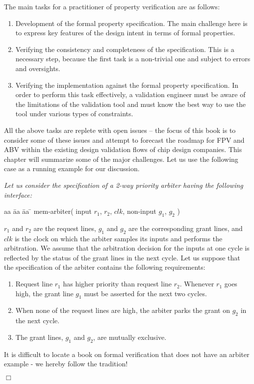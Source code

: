 The main tasks for a practitioner of property verification are as follows:
\begin{enumerate}

\item Development of the formal property specification. The main challenge
	here is to express key features of the design intent in terms of
	formal properties.

\item Verifying the consistency and completeness of the specification. This
	is a necessary step, because the first task is a non-trivial one and 
	subject to errors and oversights.

\item Verifying the implementation against the formal property specification.
	In order to perform this task effectively, a validation engineer must
	be aware of the limitations of the validation tool and must know
	the best way to use the tool under various types of constraints.

\end{enumerate}
All the above tasks are replete with open issues -- the focus of this book is 
to consider some of these issues and attempt to forecast the roadmap for FPV 
and ABV within the existing design validation flows of chip design companies.
This chapter will summarize some of the major challenges. Let us use the
following case as a running example for our discussion.

\begin{example} \label{ex1}
{\em
Let us consider the specification of a 2-way priority arbiter having the 
following interface:
\begin{tabbing}
aa \= aa \= aa \= \kill
\> mem-arbiter( input $r_1$, $r_2$, $clk$, non-input $g_1$, $g_2$ )
\end{tabbing}
$r_1$ and $r_2$ are the request lines, $g_1$ and $g_2$ are the corresponding
grant lines, and $clk$ is the clock on which the arbiter samples its inputs
and performs the arbitration. We assume that the arbitration decision for the
inputs at one cycle is reflected by the status of the grant lines in the
next cycle. Let us suppose that the specification of the arbiter contains 
the following requirements:
\begin{enumerate}

\item Request line $r_1$ has higher priority than request line $r_2$. Whenever
	$r_1$ goes high, the grant line $g_1$ must be asserted for the
	next two cycles.

\item When none of the request lines are high, the arbiter parks the grant
	on $g_2$ in the next cycle.

\item The grant lines, $g_1$ and $g_2$, are mutually exclusive.

\end{enumerate}
It is difficult to locate a book on formal verification that does not have
an arbiter example - we hereby follow the tradition!
} $\Box$
\end{example}


